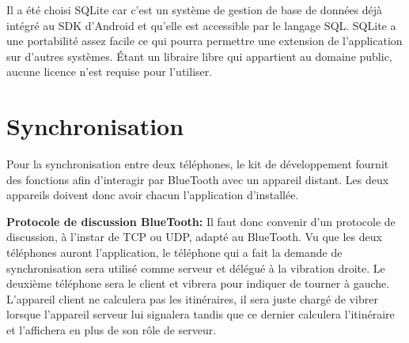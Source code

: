 \documentclass[12pt]{report}
\begin{document}
Il a été choisi SQLite car c'est un système de gestion de base de données déjà intégré au SDK d'Android et qu'elle est accessible par le langage SQL. SQLite a une portabilité assez facile ce qui pourra permettre une extension de l'application sur d'autres systèmes. Étant un libraire libre qui appartient au domaine public, aucune licence n'est requise pour l'utiliser. 

   \section{Synchronisation} Pour la synchronisation entre deux téléphones, le kit de développement fournit des fonctions afin d'interagir par BlueTooth avec un appareil distant. Les deux appareils doivent donc avoir chacun l'application d'installée. 

\textbf{Protocole de discussion BlueTooth:} Il faut donc convenir d'un protocole de discussion, à l'instar de TCP ou UDP, adapté au BlueTooth. Vu que les deux téléphones auront l'application, le téléphone qui a fait la demande de synchronisation sera utilisé comme serveur et délégué à la vibration droite. Le deuxième téléphone sera le client et vibrera pour indiquer de tourner à gauche. L'appareil client ne calculera pas les itinéraires, il sera juste chargé de vibrer lorsque l'appareil serveur lui signalera tandis que ce dernier calculera l'itinéraire et l'affichera en plus de son rôle de serveur.
\end{document}
